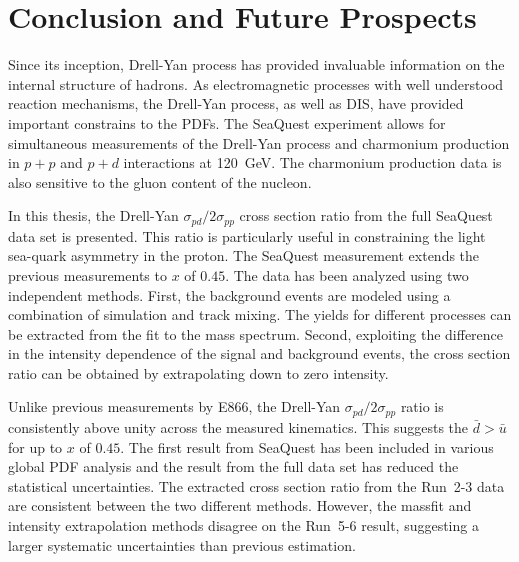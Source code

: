 \documentclass[../main.tex]{subfiles}
\begin{document}
\ifSubfilesClassLoaded{
	\mainmatter
	\setcounter{chapter}{5}
}{}

\chapter{Conclusion and Future Prospects}
\label{ch:conclusion}
Since its inception, Drell-Yan process has provided invaluable information
on the internal structure of hadrons.
As electromagnetic processes with well understood reaction mechanisms,
the Drell-Yan process, as well as DIS, have provided important constrains to the PDFs. 
The SeaQuest experiment allows for simultaneous measurements of the Drell-Yan process
and charmonium production in $p+p$ and $p+d$ interactions at \SI{120}{\GeV}.
The charmonium production data is also sensitive to the gluon content of the nucleon.

In this thesis, the Drell-Yan $\sigma_{pd}/2\sigma_{pp}$ cross section ratio from the full
SeaQuest data set is presented. This ratio is particularly useful in constraining
the light sea-quark asymmetry in the proton. The SeaQuest measurement extends the
previous measurements to $x$ of $0.45$.
The data has been analyzed using two independent methods.
First, the background events are modeled using a combination of simulation and
track mixing. The yields for different processes can be extracted from the fit to
the mass spectrum.
Second, exploiting the difference in the intensity dependence of the signal and background events,
the cross section ratio can be obtained by extrapolating down to zero intensity.

Unlike previous measurements by E866, the  Drell-Yan $\sigma_{pd}/2\sigma_{pp}$ ratio
is consistently above unity across the measured kinematics.
This suggests the $\bar{d}>\bar{u}$ for up to $x$ of $0.45$.
The first result from SeaQuest has been included in various global PDF analysis
and the result from the full data set has reduced the statistical uncertainties.
The extracted cross section ratio from the Run~2-3
data are consistent between the two different methods. However, the massfit
and intensity extrapolation methods disagree on the Run~5-6 result,
suggesting a larger systematic uncertainties than previous estimation.
\end{document}
